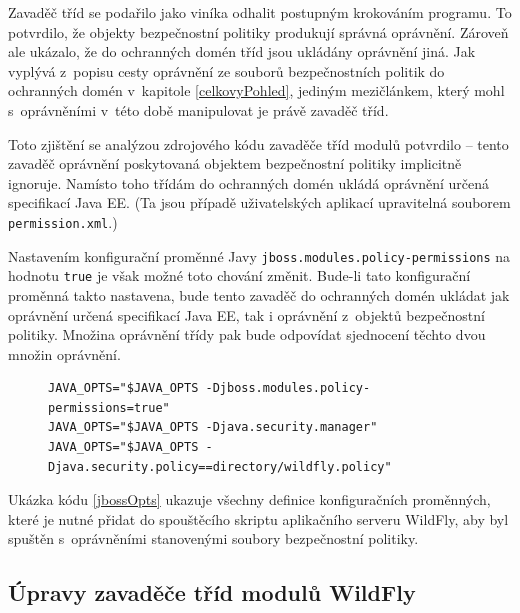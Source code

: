 Zavaděč tříd se podařilo jako viníka odhalit postupným krokováním programu.
To potvrdilo, že objekty bezpečnostní politiky produkují správná oprávnění.
Zároveň ale ukázalo, že do ochranných domén tříd jsou ukládány oprávnění jiná.
Jak vyplývá z~popisu cesty oprávnění ze souborů bezpečnostních politik do ochranných domén v~kapitole \ref{celkovyPohled},
jediným mezičlánkem, který mohl s~oprávněními v~této době manipulovat je právě zavaděč tříd.

Toto zjištění se analýzou zdrojového kódu zavaděče tříd modulů potvrdilo -- tento zavaděč oprávnění poskytovaná objektem bezpečnostní politiky implicitně ignoruje.
Namísto toho třídám do ochranných domén ukládá oprávnění určená specifikací Java EE. \cite{javaEEspec}
(Ta jsou případě uživatelských aplikací upravitelná souborem {\tt permission.xml}.)

Nastavením konfigurační proměnné Javy {\tt jboss.modules.policy-permissions} na hodnotu {\tt true} je však možné toto chování změnit.
Bude-li tato konfigurační proměnná takto nastavena, bude tento zavaděč do ochranných domén ukládat jak oprávnění určená specifikací Java EE, tak i oprávnění z~objektů bezpečnostní politiky.
Množina oprávnění třídy pak bude odpovídat sjednocení těchto dvou množin oprávnění.
\cite{sourceModuleClassLoader}

\begin{figure}[tbh]
\begin{lstlisting}[caption=Úprava spouštěcího skriptu pro spuštění se souborem bezpečnostní politiky, label=jbossOpts]
JAVA_OPTS="$JAVA_OPTS -Djboss.modules.policy-permissions=true"
JAVA_OPTS="$JAVA_OPTS -Djava.security.manager"
JAVA_OPTS="$JAVA_OPTS -Djava.security.policy==directory/wildfly.policy"
\end{lstlisting}
\end{figure}

Ukázka kódu \ref{jbossOpts} ukazuje všechny definice konfiguračních proměnných, které je nutné přidat do spouštěcího skriptu aplikačního serveru WildFly,
aby byl spuštěn s~oprávněními stanovenými soubory bezpečnostní politiky.

\subsection{Úpravy zavaděče tříd modulů WildFly} \label{upravaZavadeceWildFly}

